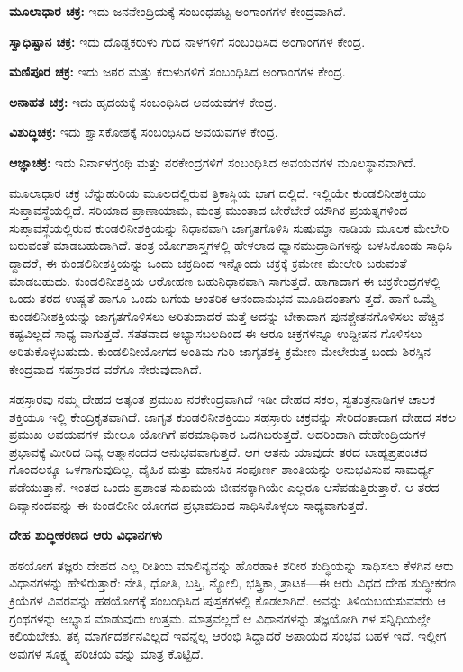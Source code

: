  \textbf{ಮೂಲಾಧಾರ ಚಕ್ರ:} ಇದು ಜನನೇಂದ್ರಿಯಕ್ಕೆ ಸಂಬಂಧಪಟ್ಟ ಅಂಗಾಂಗಗಳ ಕೇಂದ್ರವಾಗಿದೆ.

 \textbf{ಸ್ವಾಧಿಷ್ಟಾನ ಚಕ್ರ:} ಇದು ದೊಡ್ಡಕರುಳು ಗುದ ನಾಳಗಳಿಗೆ ಸಂಬಂಧಿಸಿದ ಅಂಗಾಂಗಗಳ ಕೇಂದ್ರ.

 \textbf{ಮಣಿಪೂರ ಚಕ್ರ:} ಇದು ಜಠರ ಮತ್ತು ಕರುಳುಗಳಿಗೆ ಸಂಬಂಧಿಸಿದ ಅಂಗಾಂಗಗಳ ಕೇಂದ್ರ.

 \textbf{ಅನಾಹತ ಚಕ್ರ:} ಇದು ಹೃದಯಕ್ಕೆ ಸಂಬಂಧಿಸಿದ ಅವಯವಗಳ ಕೇಂದ್ರ.

 \textbf{ವಿಶುದ್ಧಿಚಕ್ರ:} ಇದು ಶ್ವಾಸಕೋಶಕ್ಕೆ ಸಂಬಂಧಿಸಿದ ಅವಯವಗಳ ಕೇಂದ್ರ.

 \textbf{ಆಜ್ಞಾಚಕ್ರ:} ಇದು ನಿರ್ನಾಳಗ್ರಂಥಿ ಮತ್ತು ನರಕೇಂದ್ರಗಳಿಗೆ ಸಂಬಂಧಿಸಿದ ಅವಯವಗಳ ಮೂಲಸ್ಥಾನವಾಗಿದೆ.

ಮೂಲಾಧಾರ ಚಕ್ರ ಬೆನ್ನುಹುರಿಯ ಮೂಲದಲ್ಲಿರುವ ತ್ರಿಕಾಸ್ಥಿಯ ಭಾಗ ದಲ್ಲಿದೆ. ಇಲ್ಲಿಯೇ ಕುಂಡಲಿನೀಶಕ್ತಿಯು ಸುಪ್ತಾವಸ್ಥೆಯಲ್ಲಿದೆ. ಸರಿಯಾದ ಪ್ರಾಣಾಯಾಮ, ಮಂತ್ರ ಮುಂತಾದ ಬೇರೆಬೇರೆ ಯೌಗಿಕ ಪ್ರಯತ್ನಗಳಿಂದ ಸುಪ್ತಾವಸ್ಥೆಯಲ್ಲಿರುವ ಕುಂಡಲಿನೀಶಕ್ತಿಯನ್ನು ನಿಧಾನವಾಗಿ ಜಾಗೃತಗೊಳಿಸಿ ಸುಷುಮ್ನಾ ನಾಡಿಯ ಮೂಲಕ ಮೇಲೇರಿ ಬರುವಂತೆ ಮಾಡಬಹುದಾಗಿದೆ. ತಂತ್ರ ಯೋಗಶಾಸ್ತ್ರಗಳಲ್ಲಿ ಹೇಳಲಾದ ಧ್ಯಾನಮುದ್ರಾದಿಗಳನ್ನು ಬಳಸಿಕೊಂಡು ಸಾಧಿಸಿ ದ್ದಾದರೆ, ಈ ಕುಂಡಲಿನೀಶಕ್ತಿಯನ್ನು ಒಂದು ಚಕ್ರದಿಂದ ಇನ್ನೊಂದು ಚಕ್ರಕ್ಕೆ ಕ್ರಮೇಣ ಮೇಲೇರಿ ಬರುವಂತೆ ಮಾಡಬಹುದು. ಕುಂಡಲಿನೀಶಕ್ತಿಯ ಆರೋಹಣ ಬಹುನಿಧಾನವಾಗಿ ಸಾಗುತ್ತದೆ. ಹಾಗಾದಾಗ ಈ ಚಕ್ರಕೇಂದ್ರಗಳಲ್ಲಿ ಒಂದು ತರದ ಉಷ್ಣತೆ ಹಾಗೂ ಒಂದು ಬಗೆಯ ಆಂತರಿಕ ಆನಂದಾನುಭವ ಮೂಡಿದಂತಾಗು ತ್ತದೆ. ಹಾಗೆ ಒಮ್ಮೆ ಕುಂಡಲಿನೀಶಕ್ತಿಯನ್ನು ಜಾಗೃತಗೊಳಿಸಲು ಅರಿತುದಾದರೆ ಮತ್ತೆ ಅದನ್ನು ಬೇಕಾದಾಗ ಪುನಶ್ಚೇತನಗೊಳಿಸಲು ಹೆಚ್ಚಿನ ಕಷ್ಟವಿಲ್ಲದೆ ಸಾಧ್ಯ ವಾಗುತ್ತದೆ. ಸತತವಾದ ಅಭ್ಯಾಸಬಲದಿಂದ ಈ ಆರೂ ಚಕ್ರಗಳನ್ನೂ ಉದ್ದೀಪನ ಗೊಳಿಸಲು ಅರಿತುಕೊಳ್ಳಬಹುದು. ಕುಂಡಲಿನೀಯೋಗದ ಅಂತಿಮ ಗುರಿ ಜಾಗೃತಶಕ್ತಿ ಕ್ರಮೇಣ ಮೇಲೇರುತ್ತ ಬಂದು ಶಿರಸ್ಸಿನ ಕೇಂದ್ರವಾದ ಸಹಸ್ರಾರದ ವರೆಗೂ ಸೇರುವುದಾಗಿದೆ.

ಸಹಸ್ರಾರವು ನಮ್ಮ ದೇಹದ ಅತ್ಯಂತ ಪ್ರಮುಖ ನರಕೇಂದ್ರವಾಗಿದೆ  ಇಡೀ ದೇಹದ ಸಕಲ, ಸ್ವತಂತ್ರನಾಡಿಗಳ ಚಾಲಕ ಶಕ್ತಿಯೂ ಇಲ್ಲಿ ಕೇಂದ್ರಿಕೃತವಾಗಿದೆ. ಜಾಗೃತ ಕುಂಡಲಿನೀಶಕ್ತಿಯು ಸಹಸ್ರಾರು ಚಕ್ರವನ್ನು ಸೇರಿದಂತಾದಾಗ ದೇಹದ ಸಕಲ ಪ್ರಮುಖ ಅವಯವಗಳ ಮೇಲೂ ಯೋಗಿಗೆ ಪರಮಾಧಿಕಾರ ಒದಗಿಬರುತ್ತದೆ. ಅದರಿಂದಾಗಿ ದೇಹೇಂದ್ರಿಯಗಳ ಪ್ರಭಾವಕ್ಕೆ ಮೀರಿದ ದಿವ್ಯ ಆತ್ಮಾನಂದದ ಅನುಭವವಾಗುತ್ತದೆ. ಆಗ ಆತನು ಯಾವುದೇ ತರದ ಬಾಹ್ಯಪ್ರಪಂಚದ ಗೊಂದಲಕ್ಕೂ ಒಳಗಾಗುವುದಿಲ್ಲ. ದೈಹಿಕ ಮತ್ತು ಮಾನಸಿಕ ಸಂಪೂರ್ಣ ಶಾಂತಿಯನ್ನು ಅನುಭವಿಸುವ ಸಾಮರ್ಥ್ಯ ಪಡೆಯುತ್ತಾನೆ. ಇಂತಹ ಒಂದು ಪ್ರಶಾಂತ ಸುಖಮಯ ಜೀವನಕ್ಕಾಗಿಯೇ ಎಲ್ಲರೂ ಆಸೆಪಡುತ್ತಿರುತ್ತಾರೆ. ಆ ತರದ ದಿವ್ಯಾನಂದವನ್ನು ಈ ಕುಂಡಲೀನೀ ಯೋಗದ ಪ್ರಭಾವದಿಂದ ಸಾಧಿಸಿಕೊಳ್ಳಲು ಸಾಧ್ಯವಾಗುತ್ತದೆ.

\textbf{ದೇಹ ಶುದ್ಧೀಕರಣದ ಆರು ವಿಧಾನಗಳು}

ಹಠಯೋಗ ತಜ್ಞರು ದೇಹದ ಎಲ್ಲ ರೀತಿಯ ಮಾಲಿನ್ಯವನ್ನು ಹೊರಹಾಕಿ ಶರೀರ ಶುದ್ಧಿಯನ್ನು ಸಾಧಿಸಲು ಕೆಳಗಿನ ಆರು ವಿಧಾನಗಳನ್ನು ಹೇಳಿರುತ್ತಾರೆ:  ನೇತಿ,  ಧೋತಿ,  ಬಸ್ತಿ,  ನ್ಯೋಲಿ,  ಭಸ್ತ್ರಿಕಾ,  ತ್ರಾಟಕ—ಈ ಆರು ವಿಧದ ದೇಹ ಶುದ್ಧೀಕರಣ ಕ್ರಿಯೆಗಳ ವಿವರವನ್ನು ಹಠಯೋಗಕ್ಕೆ ಸಂಬಂಧಿಸಿದ ಪುಸ್ತಕಗಳಲ್ಲಿ ಕೊಡಲಾಗಿದೆ. ಅವನ್ನು ತಿಳಿಯಬಯಸುವವರು ಆ ಗ್ರಂಥಗಳನ್ನು ಅಭ್ಯಾಸ ಮಾಡುವುದು ಉತ್ತಮ. ಮಾತ್ರವಲ್ಲದೆ ಆ ವಿಧಾನಗಳನ್ನು ತಜ್ಞಯೋಗಿ ಗಳ ಸನ್ನಿಧಿಯಲ್ಲೇ ಕಲಿಯಬೇಕು. ತಕ್ಕ ಮಾರ್ಗದರ್ಶನವಿಲ್ಲದೆ ಇವನ್ನೆಲ್ಲ ಆರಂಭಿ ಸಿದ್ದಾದರೆ ಅಪಾಯದ ಸಂಭವ ಬಹಳ ಇದೆ. ಇಲ್ಲೀಗ ಅವುಗಳ ಸೂಕ್ಷ್ಮ ಪರಿಚಯ ವನ್ನು ಮಾತ್ರ ಕೊಟ್ಟಿದೆ.


